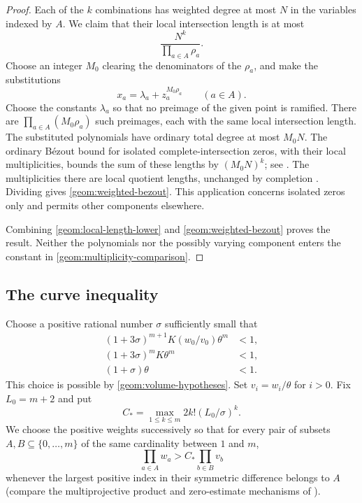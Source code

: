 \begin{proof}
Each of the $k$ combinations has weighted degree at most $N$ in the
variables indexed by $A$. We claim that their local intersection length
is at most
\begin{equation}
\label{geom:weighted-bezout}
 \frac{N^k}{\prod_{a\in A}\rho_a}.
\end{equation}
Choose an integer $M_0$ clearing the denominators of the $\rho_a$, and
make the substitutions
\[
 x_a=\lambda_a+z_a^{M_0\rho_a}\qquad(a\in A).
\]
Choose the constants $\lambda_a$ so that no preimage of the given point
is ramified. There are $\prod_{a\in A}(M_0\rho_a)$ such preimages, each
with the same local intersection length. The substituted polynomials
have ordinary total degree at most $M_0N$. The ordinary B\'ezout bound
for isolated complete-intersection zeros, with their local
multiplicities, bounds the sum of these lengths by $(M_0N)^k$;
see \cite[Corollary~VIII.3, p.~144]{mondal2021}.
The multiplicities there are local quotient lengths, unchanged by
completion \cite[Section~IV.4.2]{mondal2021}.
Dividing gives \eqref{geom:weighted-bezout}.
This application concerns isolated zeros only and permits other
components elsewhere.

Combining \eqref{geom:local-length-lower} and
\eqref{geom:weighted-bezout} proves the result. Neither the
polynomials nor the possibly varying component enters the constant in
\eqref{geom:multiplicity-comparison}.
\end{proof}

\subsection{The curve inequality}

Choose a positive rational number $\sigma$ sufficiently small that
\begin{equation}
\label{geom:sigma}
 \begin{split}
 (1+3\sigma)^{m+1}K(w_0/v_0)\theta^m&<1,\\
 (1+3\sigma)^mK\theta^m&<1,\\
 (1+\sigma)\theta&<1.
 \end{split}
\end{equation}
This choice is possible by \eqref{geom:volume-hypotheses}. Set $v_i=w_i/\theta$
for $i>0$. Fix $L_0=m+2$ and put
\begin{equation}
\label{geom:constant}
 C_* =\max_{1\le k\le m}2k!(L_0/\sigma)^k.
\end{equation}
We choose the positive weights successively so that for every pair of
subsets $A,B\subseteq\{0,\ldots,m\}$ of the same cardinality between
$1$ and $m$,
\begin{equation}
\label{geom:separation}
 \prod_{a\in A}w_a>C_*\prod_{b\in B}v_b
\end{equation}
whenever the largest positive index in their symmetric difference belongs
to $A$ (compare the multiprojective product and zero-estimate mechanisms of \cite{faltings1991,evertseferretti2002,gouillon2006}).

